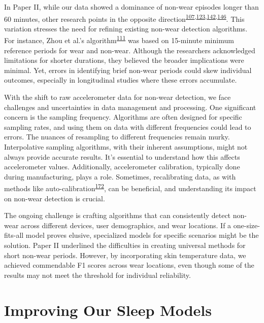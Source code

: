 \documentclass[
  10pt,
]{scrbook}
\begin{document}
In Paper II, while our data showed a dominance of non-wear episodes
longer than 60 minutes, other research points in the opposite
direction\textsuperscript{\protect\hyperlink{ref-aadland_comparison_2018}{107},\protect\hyperlink{ref-jaeschke_variability_2018}{123},\protect\hyperlink{ref-hutto_identifying_2013}{142},\protect\hyperlink{ref-vert_detecting_2022}{146}}.
This variation stresses the need for refining existing non-wear
detection algorithms. For instance, Zhou et al.'s
algorithm\textsuperscript{\protect\hyperlink{ref-zhou_classification_2015}{111}}
was based on 15-minute minimum reference periods for wear and non-wear.
Although the researchers acknowledged limitations for shorter durations,
they believed the broader implications were minimal. Yet, errors in
identifying brief non-wear periods could skew individual outcomes,
especially in longitudinal studies where these errors accumulate.

With the shift to raw accelerometer data for non-wear detection, we face
challenges and uncertainties in data management and processing. One
significant concern is the sampling frequency. Algorithms are often
designed for specific sampling rates, and using them on data with
different frequencies could lead to errors. The nuances of resampling to
different frequencies remain murky. Interpolative sampling algorithms,
with their inherent assumptions, might not always provide accurate
results. It's essential to understand how this affects accelerometer
values. Additionally, accelerometer calibration, typically done during
manufacturing, plays a role. Sometimes, recalibrating data, as with
methods like
auto-calibration\textsuperscript{\protect\hyperlink{ref-hees_2014}{172}},
can be beneficial, and understanding its impact on non-wear detection is
crucial.

The ongoing challenge is crafting algorithms that can consistently
detect non-wear across different devices, user demographics, and wear
locations. If a one-size-fits-all model proves elusive, specialized
models for specific scenarios might be the solution. Paper II underlined
the difficulties in creating universal methods for short non-wear
periods. However, by incorporating skin temperature data, we achieved
commendable F1 scores across wear locations, even though some of the
results may not meet the threshold for individual reliability.

\hypertarget{improving-our-sleep-models}{%
\section{Improving Our Sleep Models}\label{improving-our-sleep-models}}
\end{document}
